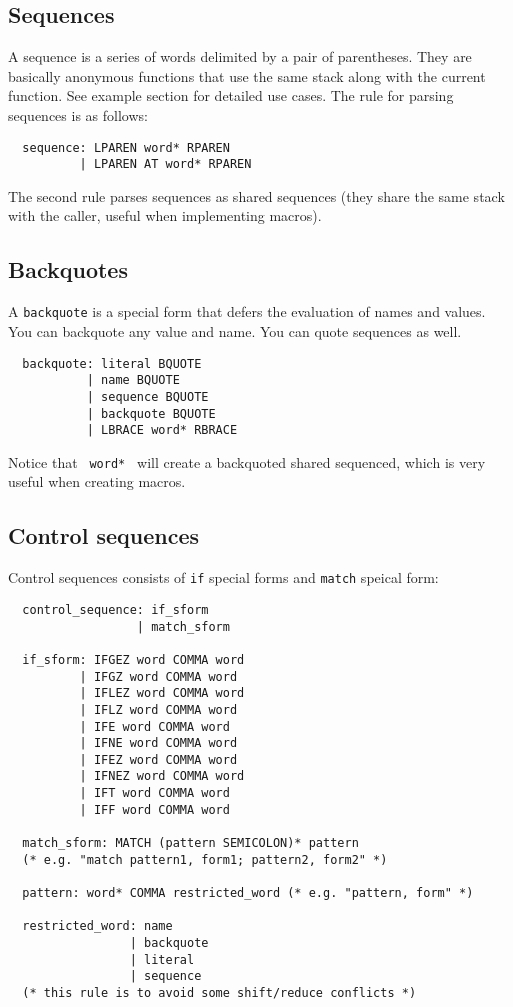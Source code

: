\documentclass{book}
\begin{document}
\subsection{Sequences}

A sequence is a series of words delimited by a pair of parentheses. They are basically anonymous functions that use the same stack along with the current function. See example section for detailed use cases. The rule for parsing sequences is as follows:
\begin{verbatim}
  sequence: LPAREN word* RPAREN
          | LPAREN AT word* RPAREN
\end{verbatim}

The second rule parses sequences as shared sequences (they share the same stack with the caller, useful when implementing macros).

\subsection{Backquotes}

A \texttt{backquote} is a special form that defers the evaluation of names and values. You can backquote any value and name. You can quote sequences as well.
\begin{verbatim}
  backquote: literal BQUOTE
           | name BQUOTE
           | sequence BQUOTE
           | backquote BQUOTE
           | LBRACE word* RBRACE
\end{verbatim}

Notice that \texttt{{ word* }} will create a backquoted shared sequenced, which is very useful when creating macros.

\subsection{Control sequences}

Control sequences consists of \texttt{if} special forms and \texttt{match} speical form:
\begin{verbatim}
  control_sequence: if_sform
                  | match_sform

  if_sform: IFGEZ word COMMA word
          | IFGZ word COMMA word
          | IFLEZ word COMMA word
          | IFLZ word COMMA word
          | IFE word COMMA word
          | IFNE word COMMA word
          | IFEZ word COMMA word
          | IFNEZ word COMMA word
          | IFT word COMMA word
          | IFF word COMMA word

  match_sform: MATCH (pattern SEMICOLON)* pattern
  (* e.g. "match pattern1, form1; pattern2, form2" *)

  pattern: word* COMMA restricted_word (* e.g. "pattern, form" *)

  restricted_word: name
                 | backquote
                 | literal
                 | sequence
  (* this rule is to avoid some shift/reduce conflicts *)
\end{verbatim}
\end{document}
